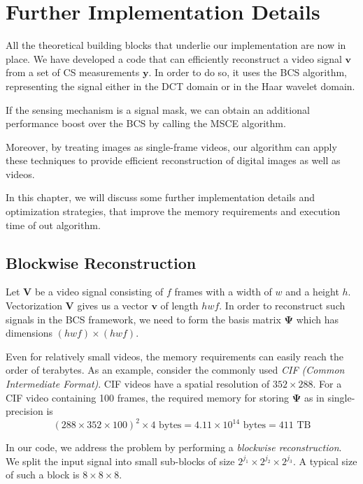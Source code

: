 \chapter{Further Implementation Details}
\label{ch:code}
All the theoretical building blocks that underlie our implementation are now in place.
We have developed a code that can efficiently reconstruct a video signal $\bm v$ from a set of CS measurements $\bm y$.
In order to do so, it uses the BCS algorithm, representing the signal either in the DCT domain or in the Haar wavelet domain.

If the sensing mechanism is a signal mask, we can obtain an additional performance boost over the BCS by calling the MSCE algorithm.

Moreover, by treating images as single-frame videos, our algorithm can apply these techniques to provide efficient reconstruction of digital images as well as videos.

In this chapter, we will discuss some further implementation details and optimization strategies, that improve the memory requirements and execution time of out algorithm.

\section{Blockwise Reconstruction}
Let $\bm V$ be a video signal consisting of $f$ frames with a width of $w$ and a height $h$.
Vectorization $\bm V$ gives us a vector $\bm v$ of length $hwf$.
In order to reconstruct such signals in the BCS framework, we need to form the basis matrix $\bm\Psi$ which has dimensions $(hwf)\times (hwf)$.

Even for relatively small videos, the memory requirements can easily reach the order of terabytes.
As an example, consider the commonly used \emph{CIF (Common Intermediate Format)}.
CIF videos have a spatial resolution of $352 \times 288$.
For a CIF video containing 100 frames, the required memory for storing $\bm\Psi$ as in single-precision is
\begin{equation*}
(288\times 352\times 100)^2 \times 4 \mbox{ bytes} = 4.11 \times 10^{14} \mbox{ bytes} = 411 \mbox{ TB}
\end{equation*}

In our code, we address the problem by performing a \emph{blockwise reconstruction}.
We split the input signal into small sub-blocks of size $2^{j_1}\times 2^{j_2}\times 2^{j_3}$.
A typical size of such a block is $8\times 8\times 8$.

